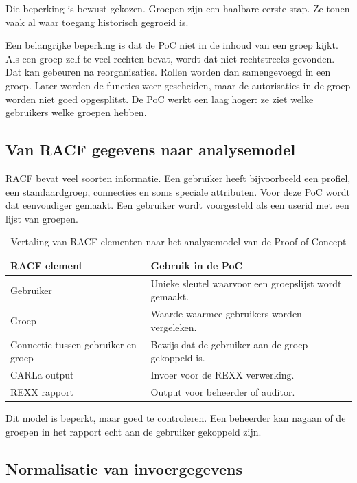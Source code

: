 Die beperking is bewust gekozen. Groepen zijn een haalbare eerste stap. Ze tonen vaak al waar toegang historisch gegroeid is.

Een belangrijke beperking is dat de PoC niet in de inhoud van een groep kijkt. Als een groep zelf te veel rechten bevat, wordt dat niet rechtstreeks gevonden. Dat kan gebeuren na reorganisaties. Rollen worden dan samengevoegd in een groep. Later worden de functies weer gescheiden, maar de autorisaties in de groep worden niet goed opgesplitst. De PoC werkt een laag hoger: ze ziet welke gebruikers welke groepen hebben.

\subsection*{Van RACF gegevens naar analysemodel}

RACF bevat veel soorten informatie. Een gebruiker heeft bijvoorbeeld een profiel, een standaardgroep, connecties en soms speciale attributen. Voor deze PoC wordt dat eenvoudiger gemaakt. Een gebruiker wordt voorgesteld als een userid met een lijst van groepen.

\begin{table}[htbp]
\centering
\caption[Vertaling van RACF elementen naar het analysemodel]{Vertaling van RACF elementen naar het analysemodel van de Proof of Concept}
\label{tab:racf-analysemodel}
\begin{tabular}{|p{4cm}|p{8cm}|}
\hline
\textbf{RACF element} & \textbf{Gebruik in de PoC} \\
\hline
Gebruiker & Unieke sleutel waarvoor een groepslijst wordt gemaakt. \\
\hline
Groep & Waarde waarmee gebruikers worden vergeleken. \\
\hline
Connectie tussen gebruiker en groep & Bewijs dat de gebruiker aan de groep gekoppeld is. \\
\hline
CARLa output & Invoer voor de REXX verwerking. \\
\hline
REXX rapport & Output voor beheerder of auditor. \\
\hline
\end{tabular}
\end{table}

Dit model is beperkt, maar goed te controleren. Een beheerder kan nagaan of de groepen in het rapport echt aan de gebruiker gekoppeld zijn.

\subsection*{Normalisatie van invoergegevens}

